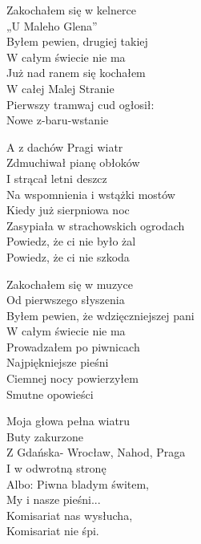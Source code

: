 \begin{text}
Zakochałem się w kelnerce\\
„U Maleho Glena”\\
Byłem pewien, drugiej takiej\\
W całym świecie nie ma\\
Już nad ranem się kochałem\\
W całej Malej Stranie\\
Pierwszy tramwaj cud ogłosił:\\
Nowe z-baru-wstanie

\vin A z dachów Pragi wiatr\\
\vin Zdmuchiwał pianę obłoków\\
\vin I strącał letni deszcz\\
\vin Na wspomnienia i wstążki mostów\\
\vin Kiedy już sierpniowa noc\\
\vin Zasypiała w strachowskich ogrodach\\
\vin Powiedz, że ci nie było żal\\
\vin Powiedz, że ci nie szkoda

Zakochałem się w muzyce\\
Od pierwszego słyszenia\\
Byłem pewien, że wdzięczniejszej pani\\
W całym świecie nie ma\\
Prowadzałem po piwnicach\\
Najpiękniejsze pieśni\\
Ciemnej nocy powierzyłem\\
Smutne opowieści

Moja głowa pełna wiatru\\
Buty zakurzone\\
Z Gdańska- Wrocław, Nahod, Praga\\
I w odwrotną stronę\\
Albo: Piwna bladym świtem,\\
My i nasze pieśni...\\
Komisariat nas wysłucha,\\
Komisariat nie śpi.
\end{text}
